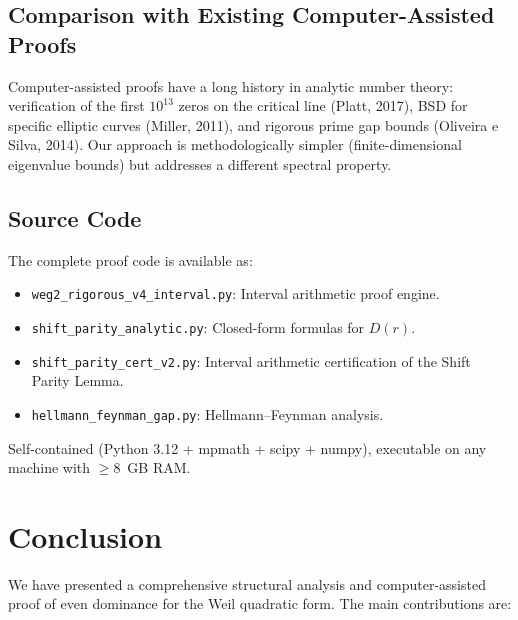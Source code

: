 \documentclass[12pt,a4paper]{article}
\theoremstyle{definition}
\theoremstyle{remark}
\begin{document}
\subsection{Comparison with Existing Computer-Assisted Proofs}

Computer-assisted proofs have a long history in analytic number theory: verification of the first $10^{13}$ zeros on the critical line (Platt, 2017), BSD for specific elliptic curves (Miller, 2011), and rigorous prime gap bounds (Oliveira e Silva, 2014). Our approach is methodologically simpler (finite-dimensional eigenvalue bounds) but addresses a different spectral property.

\subsection{Source Code}

The complete proof code is available as:
\begin{itemize}
  \item \texttt{weg2\_rigorous\_v4\_interval.py}: Interval arithmetic proof engine.
  \item \texttt{shift\_parity\_analytic.py}: Closed-form formulas for $D(r)$.
  \item \texttt{shift\_parity\_cert\_v2.py}: Interval arithmetic certification of the Shift Parity Lemma.
  \item \texttt{hellmann\_feynman\_gap.py}: Hellmann--Feynman analysis.
\end{itemize}
Self-contained (Python 3.12 + mpmath + scipy + numpy), executable on any machine with $\geq 8$~GB RAM.


\section{Conclusion}
\label{sec:conclusion}

We have presented a comprehensive structural analysis and computer-assisted proof of even dominance for the Weil quadratic form. The main contributions are:
\end{document}
